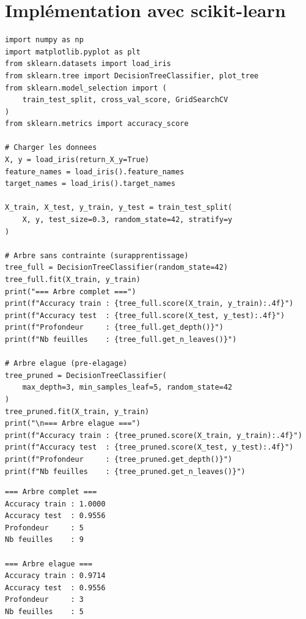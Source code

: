 \section{Impl\'ementation avec scikit-learn}
\label{sec:arbres-sklearn}

\begin{codeblock}[title=\textbf{Arbre de d\'ecision sur le dataset Iris}]
\begin{verbatim}
import numpy as np
import matplotlib.pyplot as plt
from sklearn.datasets import load_iris
from sklearn.tree import DecisionTreeClassifier, plot_tree
from sklearn.model_selection import (
    train_test_split, cross_val_score, GridSearchCV
)
from sklearn.metrics import accuracy_score

# Charger les donnees
X, y = load_iris(return_X_y=True)
feature_names = load_iris().feature_names
target_names = load_iris().target_names

X_train, X_test, y_train, y_test = train_test_split(
    X, y, test_size=0.3, random_state=42, stratify=y
)

# Arbre sans contrainte (surapprentissage)
tree_full = DecisionTreeClassifier(random_state=42)
tree_full.fit(X_train, y_train)
print("=== Arbre complet ===")
print(f"Accuracy train : {tree_full.score(X_train, y_train):.4f}")
print(f"Accuracy test  : {tree_full.score(X_test, y_test):.4f}")
print(f"Profondeur     : {tree_full.get_depth()}")
print(f"Nb feuilles    : {tree_full.get_n_leaves()}")

# Arbre elague (pre-elagage)
tree_pruned = DecisionTreeClassifier(
    max_depth=3, min_samples_leaf=5, random_state=42
)
tree_pruned.fit(X_train, y_train)
print("\n=== Arbre elague ===")
print(f"Accuracy train : {tree_pruned.score(X_train, y_train):.4f}")
print(f"Accuracy test  : {tree_pruned.score(X_test, y_test):.4f}")
print(f"Profondeur     : {tree_pruned.get_depth()}")
print(f"Nb feuilles    : {tree_pruned.get_n_leaves()}")
\end{verbatim}
\end{codeblock}

\begin{codeoutput}
\begin{verbatim}
=== Arbre complet ===
Accuracy train : 1.0000
Accuracy test  : 0.9556
Profondeur     : 5
Nb feuilles    : 9

=== Arbre elague ===
Accuracy train : 0.9714
Accuracy test  : 0.9556
Profondeur     : 3
Nb feuilles    : 5
\end{verbatim}
\end{codeoutput}

